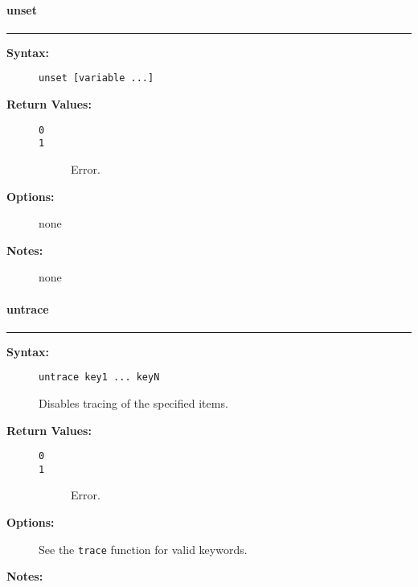 \vspace {2pt}


\paragraph{unset}

\hrule
\begin{description}
\item[{\bf Syntax:}] \mbox{}

{\tt unset [variable ...]}

\item[{\bf Return Values:}] \mbox{}

\begin{description}
\item[{\tt 0}] \mbox{}



\item[{\tt 1}] \mbox{}

Error.

\end{description}


\item[{\bf Options:}] \mbox{}

none  

\item[{\bf Notes:}] \mbox{}

none  

\end{description}


\vspace {2pt}


\paragraph{untrace}

\hrule
\begin{description}
\item[{\bf Syntax:}] \mbox{}

{\tt untrace key1 ... keyN}

Disables tracing of the specified items. 

\item[{\bf Return Values:}] \mbox{}

\begin{description}
\item[{\tt 0}] \mbox{}



\item[{\tt 1}] \mbox{}

Error.

\end{description}


\item[{\bf Options:}] \mbox{}

See the {\tt trace} function for 
valid keywords. 

\item[{\bf Notes:}] \mbox{}

  

\end{description}


